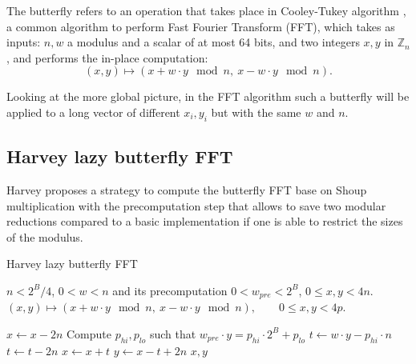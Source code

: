 \documentclass[a4paper]{article}
\begin{document}
The butterfly refers to an operation that takes place in Cooley-Tukey algorithm \cite{Cooley_Tukey_1965}, a common algorithm to perform 
Fast Fourier Transform (FFT), which takes as inputs: $n, w$ a modulus and a scalar of at most 64 bits, and two integers 
$x, y$ in $\mathbb{Z}_n$, and performs the in-place computation:
\[
(x,y) \mapsto (x + w\cdot y \mod n,\ x - w\cdot y \mod n).
\]

Looking at the more global picture, in the FFT algorithm such a butterfly will
be applied to a long vector of different \(x_i, y_i\) but with the same \(w\) and \(n\).


\subsection{Harvey lazy butterfly FFT}

Harvey proposes a strategy\cite{DBLP:journals/corr/abs-1205-2926} to compute the butterfly FFT base on Shoup multiplication
with the precomputation step that allows to save two
modular reductions compared to a basic implementation if one is able to restrict the sizes of the modulus. 

\begin{algorithm}
    \caption{Harvey lazy butterfly FFT}
    \begin{algorithmic}[1]
        \Require $n < 2^B/4$,
        \Require $0 < w < n$ and its precomputation $0 < w_{pre} < 2^B$,
        \Require $0 \leq x, y < 4n$.
        \Ensure $(x,y) \mapsto (x + w\cdot y \mod n,\ x - w\cdot y \mod n), \qquad 0 \leq x,y < 4p.$

            \State $x \gets x - 2n$
        \EndIf
        \State Compute $p_{hi}, p_{lo}$ such that $w_{pre} \cdot y = p_{hi}\cdot 2^B + p_{lo}$ 
        \State $t \gets w\cdot y - p_{hi}\cdot n$ 
            \State $t \gets t - 2n$
        \EndIf
        \State $x \gets x + t$
        \State $y \gets x - t + 2n$
        \State \Return $x,y$
    \end{algorithmic}
\end{algorithm}
\end{document}
